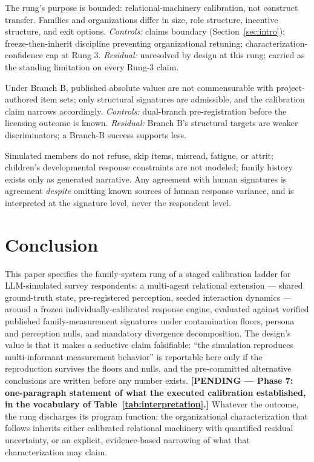 \documentclass[12pt, letterpaper]{article}
\newcommand{\pending}[1]{\textcolor{blue!55!black}{\textbf{[PENDING --- #1]}}}
\begin{document}
\begin{description}[nosep]
    \item[T6 --- Family-to-organization equivalence.] The rung's purpose is bounded: relational-machinery calibration, not construct transfer. Families and organizations differ in size, role structure, incentive structure, and exit options. \emph{Controls:} claims boundary (Section~\ref{sec:intro}); freeze-then-inherit discipline preventing organizational retuning; characterization-confidence cap at Rung 3. \emph{Residual:} unresolved by design at this rung; carried as the standing limitation on every Rung-3 claim.
    \item[Licensing commensurability.] Under Branch B, published absolute values are not commensurable with project-authored item sets; only structural signatures are admissible, and the calibration claim narrows accordingly. \emph{Controls:} dual-branch pre-registration before the licensing outcome is known. \emph{Residual:} Branch B's structural targets are weaker discriminators; a Branch-B success supports less.
    \item[Construct underrepresentation of simulated families.] Simulated members do not refuse, skip items, misread, fatigue, or attrit; children's developmental response constraints are not modeled; family history exists only as generated narrative. Any agreement with human signatures is agreement \emph{despite} omitting known sources of human response variance, and is interpreted at the signature level, never the respondent level.
\end{description}

\section{Conclusion}
\label{sec:conclusion}

This paper specifies the family-system rung of a staged calibration ladder for LLM-simulated survey respondents: a multi-agent relational extension --- shared ground-truth state, pre-registered perception, seeded interaction dynamics --- around a frozen individually-calibrated response engine, evaluated against verified published family-measurement signatures under contamination floors, persona and perception nulls, and mandatory divergence decomposition. The design's value is that it makes a seductive claim falsifiable: ``the simulation reproduces multi-informant measurement behavior'' is reportable here only if the reproduction survives the floors and nulls, and the pre-committed alternative conclusions are written before any number exists. \pending{Phase 7: one-paragraph statement of what the executed calibration established, in the vocabulary of Table~\ref{tab:interpretation}.} Whatever the outcome, the rung discharges its program function: the organizational characterization that follows inherits either calibrated relational machinery with quantified residual uncertainty, or an explicit, evidence-based narrowing of what that characterization may claim.
\end{document}
